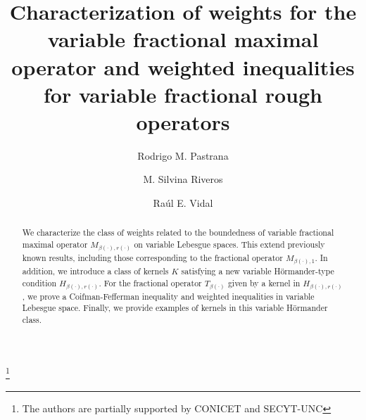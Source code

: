 \documentclass[a4paper,11pt,reqno]{amsart}
\theoremstyle{plain}
\numberwithin{equation}{section}
\theoremstyle{definition}
\begin{document}
\baselineskip=17pt

\title[Weights for variable fractional maximal and rough operators]{Characterization of weights for the variable fractional maximal operator and weighted inequalities for variable fractional rough operators}


\author[R.~M.~Pastrana]{Rodrigo M. Pastrana}
\address{R.~M.~Pastrana\\ FaMAF \\ Universidad Nacional de C\'ordoba \\
CIEM (CONICET) \\ 5000 C\'ordoba, Argentina}

\author[M.~S.~Riveros]{M. Silvina Riveros}
\address{M.~S.~Riveros \\ FaMAF \\ Universidad Nacional de C\'ordoba \\
CIEM (CONICET) \\ 5000 C\'ordoba, Argentina}


\author[R.~E.~Vidal]{Ra\'ul E. Vidal}
\address{R.~E.~Vidal \\ FaMAF \\ Universidad Nacional de C\'ordoba \\
	CIEM (CONICET) \\ 5000 C\'ordoba, Argentina}


\begin{abstract} 
	We characterize the class of weights related to the boundedness of variable fractional maximal operator $M_{\beta(\cdot),r(\cdot)}$	
	on variable Lebesgue spaces. This extend previously known results, including those corresponding to the fractional operator 
	$M_{\beta(\cdot),1}$. 
	In addition, we introduce a class of kernels $K$
	satisfying a new variable Hörmander-type condition $H_{\beta(\cdot),r(\cdot)}$. For the fractional operator $T_{\beta(\cdot)}$ given by a kernel in $H_{\beta(\cdot),r(\cdot)}$, we prove a Coifman-Fefferman inequality and weighted inequalities in variable Lebesgue space. Finally, we provide examples of kernels in this variable Hörmander class.
\end{abstract}



\thanks{ The authors are  partially supported by CONICET and SECYT-UNC}



\end{document}
